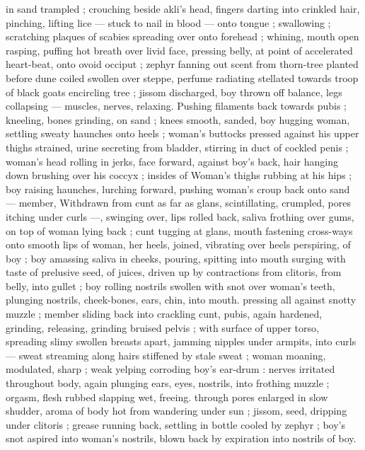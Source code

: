 in sand trampled ; crouching beside akli's head, fingers darting into 
crinkled hair, pinching, lifting lice --- stuck to nail in blood --- onto 
tongue ; swallowing ; scratching plaques of scabies spreading over 
onto forehead ; whining, mouth open rasping, puffing hot breath 
over livid face, pressing belly, at point of accelerated heart-beat, 
onto ovoid occiput ; zephyr fanning out scent from thorn-tree planted 
before dune coiled swollen over steppe, perfume radiating stellated 
towards troop of black goats encircling tree ; jissom discharged, boy 
thrown off balance, legs collapsing --- muscles, nerves, relaxing. 
Pushing filaments back towards pubis ; kneeling, bones grinding, on 
sand ; knees smooth, sanded, boy hugging woman, settling sweaty 
haunches onto heels ; woman's buttocks pressed against his upper 
thighs strained, urine secreting from bladder, stirring in duct of 
cockled penis ; woman's head rolling in jerks, face forward, against 
boy's back, hair hanging down brushing over his coccyx ; insides of 
Woman's thighs rubbing at his hips ; boy raising haunches, lurching 
forward, pushing woman's croup back onto sand --- member, 
Withdrawn from cunt as far as glans, scintillating, crumpled, pores 
itching under curls ---, swinging over, lips rolled back, saliva frothing 
over gums, on top of woman lying back ; cunt tugging at glans, 
mouth fastening cross-ways onto smooth lips of woman, her heels, 
joined, vibrating over heels perspiring, of boy ; boy amassing saliva 
in cheeks, pouring, spitting into mouth surging with taste of 
prelusive seed, of juices, driven up by contractions from clitoris, from 
belly, into gullet ; boy rolling nostrils swollen with snot over woman's 
teeth, plunging nostrils, cheek-bones, ears, chin, into mouth. 
pressing all against snotty muzzle ; member sliding back into 
crackling cunt, pubis, again hardened, grinding, releasing, grinding 
bruised pelvis ; with surface of upper torso, spreading slimy swollen 
breasts apart, jamming nipples under armpits, into curls --- sweat 
streaming along hairs stiffened by stale sweat ; woman moaning, 
modulated, sharp ; weak yelping corroding boy's ear-drum : nerves 
irritated throughout body, again plunging ears, eyes, nostrils, into 
frothing muzzle ; orgasm, flesh rubbed slapping wet, freeing. 
through pores enlarged in slow shudder, aroma of body hot from 
wandering under sun ; jissom, seed, dripping under clitoris ; grease 
running back, settling in bottle cooled by zephyr ; boy's snot aspired 
into woman's nostrils, blown back by expiration into nostrils of boy. 
